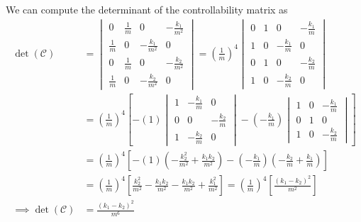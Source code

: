 We can compute the determinant of the controllability matrix as
\begin{align*}
    \det(\mathcal{C})
     & =
    \begin{vmatrix}
        0           & \frac{1}{m} & 0                  & -\frac{k_{1}}{m^2} \\
        \frac{1}{m} & 0           & -\frac{k_{1}}{m^2} & 0                  \\
        0           & \frac{1}{m} & 0                  & -\frac{k_{2}}{m^2} \\
        \frac{1}{m} & 0           & -\frac{k_{2}}{m^2} & 0
    \end{vmatrix}
    =
    {\left( \frac{1}{m} \right)}^{4}
    \begin{vmatrix}
        0 & 1 & 0                & -\frac{k_{1}}{m} \\
        1 & 0 & -\frac{k_{1}}{m} & 0                \\
        0 & 1 & 0                & -\frac{k_{2}}{m} \\
        1 & 0 & -\frac{k_{2}}{m} & 0
    \end{vmatrix}
    \\ & =
    {\left( \frac{1}{m} \right)}^{4}
    \left[
        - (1)
        \begin{vmatrix}
            1 & -\frac{k_{1}}{m} & 0                \\
            0 & 0                & -\frac{k_{2}}{m} \\
            1 & -\frac{k_{2}}{m} & 0
        \end{vmatrix}
        - \left( -\frac{k_{1}}{m} \right)
        \begin{vmatrix}
            1 & 0 & -\frac{k_{1}}{m} \\
            0 & 1 & 0                \\
            1 & 0 & -\frac{k_{2}}{m}
        \end{vmatrix}
        \right]
    \\ & =
    {\left( \frac{1}{m} \right)}^{4}
    \left[
        - (1)
        \left( -\frac{k_{2}^2}{m^2} + \frac{k_{1}k_{2}}{m^2} \right)
        - \left( -\frac{k_{1}}{m} \right)
        \left( -\frac{k_{2}}{m} + \frac{k_{1}}{m} \right)
        \right]
    \\ & =
    {\left( \frac{1}{m} \right)}^{4}
    \left[
    \frac{k_{2}^2}{m^2} - \frac{k_{1}k_{2}}{m^2} - \frac{k_{1}k_{2}}{m^2} + \frac{k_{1}^2}{m^2}
    \right]
    =
    {\left( \frac{1}{m} \right)}^{4}
    \left[
        \frac{{(k_1 - k_2)}^{2}}{m^2}
        \right]
    \\
    \implies
    \det(\mathcal{C})
     & =
    \frac{{(k_1 - k_2)}^{2}}{m^6}
\end{align*}

